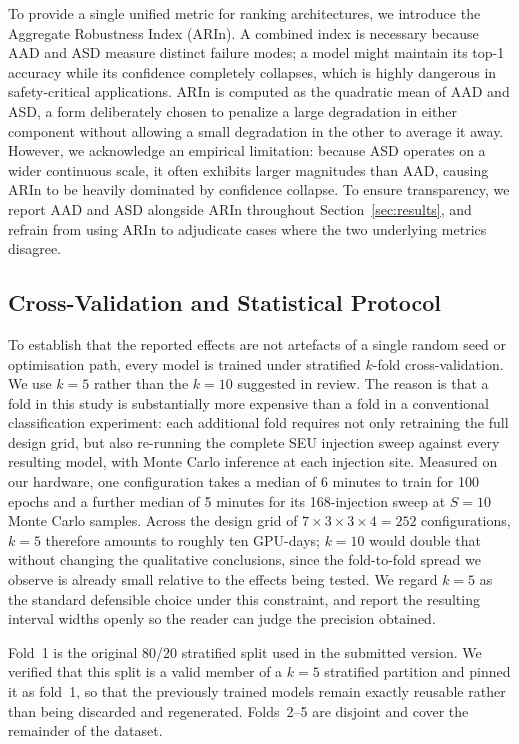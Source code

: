 \documentclass[a4paper,twoside]{article}
\begin{document}
To provide a single unified metric for ranking architectures, we introduce the Aggregate Robustness Index (ARIn). A combined index is necessary because AAD and ASD measure distinct failure modes; a model might maintain its top-1 accuracy while its confidence completely collapses, which is highly dangerous in safety-critical applications. ARIn is computed as the quadratic mean of AAD and ASD, a form deliberately chosen to penalize a large degradation in either component without allowing a small degradation in the other to average it away. However, we acknowledge an empirical limitation: because ASD operates on a wider continuous scale, it often exhibits larger magnitudes than AAD, causing ARIn to be heavily dominated by confidence collapse. To ensure transparency, we report AAD and ASD alongside ARIn throughout Section~\ref{sec:results}, and refrain from using ARIn to adjudicate cases where the two underlying metrics disagree.

\subsection{Cross-Validation and Statistical Protocol}

To establish that the reported effects are not artefacts of a single random
seed or optimisation path, every model is trained under stratified $k$-fold
cross-validation. We use $k=5$ rather than the $k=10$ suggested in review.
The reason is that a fold in this study is substantially more expensive than a
fold in a conventional classification experiment: each additional fold requires
not only retraining the full design grid, but also re-running the complete SEU
injection sweep against every resulting model, with Monte Carlo inference at
each injection site. Measured on our hardware, one configuration takes a median
of 6 minutes to train for 100 epochs and a further median of 5 minutes for its
168-injection sweep at $S=10$ Monte Carlo samples. Across the design grid of
$7 \times 3 \times 3 \times 4 = 252$ configurations, $k=5$ therefore amounts to
roughly ten GPU-days; $k=10$ would double that without changing the qualitative
conclusions, since the fold-to-fold spread we observe is already small relative
to the effects being tested. We regard $k=5$ as the standard defensible choice
under this constraint, and report the resulting interval widths openly so the
reader can judge the precision obtained.

Fold~1 is the original 80/20 stratified split used in the submitted version. We
verified that this split is a valid member of a $k=5$ stratified partition and
pinned it as fold~1, so that the previously trained models remain exactly
reusable rather than being discarded and regenerated. Folds~2--5 are disjoint
and cover the remainder of the dataset.
\end{document}
